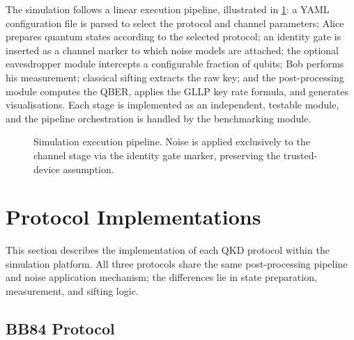 The simulation follows a linear execution pipeline, illustrated in \cref{fig:pipeline}: a YAML configuration file is parsed to select the protocol and channel parameters; Alice prepares quantum states according to the selected protocol; an identity gate is inserted as a channel marker to which noise models are attached; the optional eavesdropper module intercepts a configurable fraction of qubits; Bob performs his measurement; classical sifting extracts the raw key; and the post-processing module computes the QBER, applies the GLLP key rate formula, and generates visualisations. Each stage is implemented as an independent, testable module, and the pipeline orchestration is handled by the benchmarking module.

\begin{figure}[ht]
    \centering
    \caption{Simulation execution pipeline. Noise is applied exclusively to the channel stage via the identity gate marker, preserving the trusted-device assumption.}
    \label{fig:pipeline}
\end{figure}



\section{Protocol Implementations}

This section describes the implementation of each QKD protocol within the simulation platform. All three protocols share the same post-processing pipeline and noise application mechanism; the differences lie in state preparation, measurement, and sifting logic.

\subsection{BB84 Protocol}


